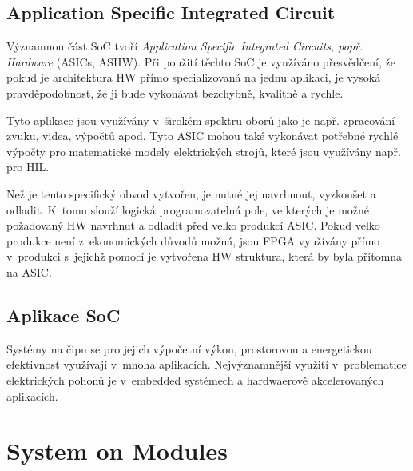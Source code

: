 \documentclass[a4paper, twoside, 11pt]{article}
\begin{document}
	\subsection{Application Specific Integrated Circuit}
		Významnou část SoC tvoří \textit{Application Specific Integrated Circuits, popř. Hardware} (ASICs, ASHW). Při použití těchto SoC je využíváno přesvědčení, že pokud je architektura HW přímo specializovaná na jednu aplikaci, je vysoká pravděpodobnost, že ji bude vykonávat bezchybně, kvalitně a rychle.\par
		Tyto aplikace jsou využívány v~širokém spektru oborů jako je např. zpracování zvuku, videa, výpočtů apod. Tyto ASIC mohou také vykonávat potřebné rychlé výpočty pro matematické modely elektrických strojů, které jsou využívány např. pro HIL.\par
		Než je tento specifický obvod vytvořen, je nutné jej navrhnout, vyzkoušet a odladit. K~tomu slouží logická programovatelná pole, ve kterých je možné požadovaný HW navrhnut a odladit před velko produkcí ASIC. Pokud velko produkce není z~ekonomických důvodů možná, jsou FPGA využívány přímo v~produkci s~jejichž pomocí je vytvořena HW struktura, která by byla přítomna na ASIC.


	\subsection{Aplikace SoC}
	Systémy na čipu se pro jejich výpočetní výkon, prostorovou a energetickou efektivnost využívají v~mnoha aplikacích. Nejvýznamnější využití v~problematice elektrických pohonů je v~embedded systémech a hardwaerově akcelerovaných aplikacích.

\section{System on Modules}\label{sec:system-on-modules}
\end{document}

